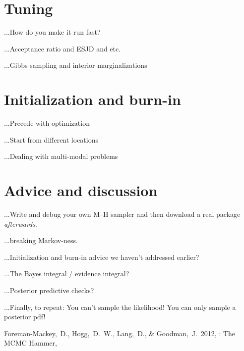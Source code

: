 \documentclass[12pt,twoside,pdftex]{article}
\begin{document}
\section{Tuning}

...How do you make it run fast?

...Acceptance ratio and ESJD and etc.

...Gibbs sampling and interior marginalizations

\section{Initialization and burn-in}

...Precede with optimization

...Start from different locations

...Dealing with multi-modal problems

\section{Advice and discussion}

...Write and debug your own M--H sampler and then download a real
package \emph{afterwards}.

...breaking Markov-ness.

...Initialization and burn-in advice we haven't addressed earlier?

...The Bayes integral / evidence integral?

...Posterior predictive checks?

...Finally, to repeat: You can't sample the likelihood!  You can only
sample a posterior pdf!


\clearpage
{}\theendnotes

\clearpage
\begin{thebibliography}{}
  Foreman-Mackey,~D., Hogg,~D.~W., Lang,~D., \& Goodman,~J.\ 2012,
  : The MCMC Hammer,
\end{thebibliography}
\end{document}
